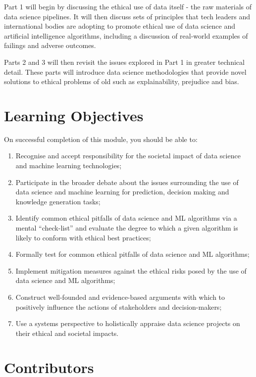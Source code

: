 \documentclass[
]{book}
\providecommand{\tightlist}{%
  \setlength{\itemsep}{0pt}\setlength{\parskip}{0pt}}
\theoremstyle{definition}
\theoremstyle{definition}
\theoremstyle{definition}
\theoremstyle{definition}
\theoremstyle{remark}
\begin{document}
Part 1 will begin by discussing the ethical use of data itself - the raw materials of data science pipelines. It will then discuss sets of principles that tech leaders and international bodies are adopting to promote ethical use of data science and artificial intelligence algorithms, including a discussion of real-world examples of failings and adverse outcomes.

Parts 2 and 3 will then revisit the issues explored in Part 1 in greater technical detail. These parts will introduce data science methodologies that provide novel solutions to ethical problems of old such as explainability, prejudice and bias.

\hypertarget{learning-objectives}{%
\section*{Learning Objectives}\label{learning-objectives}}

On successful completion of this module, you should be able to:

\begin{enumerate}
\def\labelenumi{\arabic{enumi}.}
\tightlist
\item
  Recognise and accept responsibility for the societal impact of data science and machine learning technologies;
\item
  Participate in the broader debate about the issues surrounding the use of data science and machine learning for prediction, decision making and knowledge generation tasks;
\item
  Identify common ethical pitfalls of data science and ML algorithms via a mental ``check-list'' and evaluate the degree to which a given algorithm is likely to conform with ethical best practices;
\item
  Formally test for common ethical pitfalls of data science and ML algorithms;
\item
  Implement mitigation measures against the ethical risks posed by the use of data science and ML algorithms;
\item
  Construct well-founded and evidence-based arguments with which to positively influence the actions of stakeholders and decision-makers;
\item
  Use a systems perspective to holistically appraise data science projects on their ethical and societal impacts.
\end{enumerate}

\hypertarget{contributors}{%
\section*{Contributors}\label{contributors}}
\end{document}
